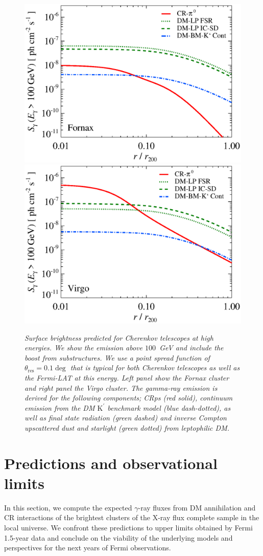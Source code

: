 \documentclass[10pt,aps,pra,reprint,amsmath,amsfonts,amssymb,showpacs]{revtex4-1}
\newcommand{\rmn}{\mathrm}
\newcommand{\psf}{\theta_\rmn{res}}
\newcommand{\Kp}{\rmn{K}^\prime}
\begin{document}
\begin{figure}
\begin{minipage}{2.0\columnwidth}
  \includegraphics[width=0.49\columnwidth]{figures/SB.Fornax.v9.SF300.SubMass.elmu.eps}
  \includegraphics[width=0.49\columnwidth]{figures/SB.Virgo.v9.SF300.SubMass.elmu.eps}
\caption{\it Surface brightness predicted for Cherenkov telescopes at
  high energies. We show the emission above $100$~GeV and include the
  boost from substructures. We use a point spread function of
  $\psf=0.1\deg$ that is typical for both Cherenkov
  telescopes as well as the Fermi-LAT at this energy. Left panel show
  the Fornax cluster and right panel the Virgo cluster. The gamma-ray
  emission is derived for the following components; CRps (red solid),
  continuum emission from the DM $\Kp$ benchmark model (blue
  dash-dotted), as well as final state radiation (green dashed) and
  inverse Compton upscattered dust and starlight (green dotted) from
  leptophilic DM.}
 \label{fig:SB_IACTs}
\end{minipage}
\end{figure}



\section{Predictions and observational limits}


In this section, we compute the expected $\gamma$-ray fluxes from DM
annihilation and CR interactions of the brightest clusters of the X-ray flux
complete sample in the local universe. We confront these predictions to upper
limits obtained by Fermi 1.5-year data and conclude on the viability of the
underlying models and perspectives for the next years of Fermi observations.
\end{document}
